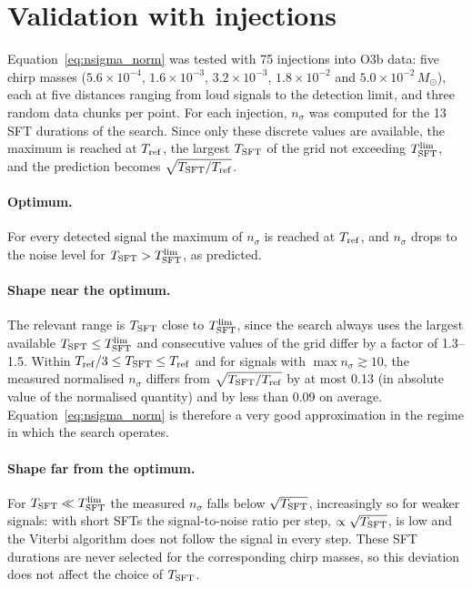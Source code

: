 \documentclass[11pt]{article}
\newcommand{\Tsft}{T_{\rm SFT}}
\newcommand{\Tlim}{T_{\rm SFT}^{\rm lim}}
\begin{document}
\section{Validation with injections}

Equation~\eqref{eq:nsigma_norm} was tested with 75 injections into O3b data:
five chirp masses ($5.6\times10^{-4}$, $1.6\times10^{-3}$, $3.2\times10^{-3}$,
$1.8\times10^{-2}$ and $5.0\times10^{-2}\,M_\odot$), each at five distances ranging
from loud signals to the detection limit, and three random data chunks per point.
For each injection, $n_\sigma$ was computed for the 13 SFT durations of the search.
Since only these discrete values are available, the maximum is reached at
$T_{\rm ref}$, the largest $\Tsft$ of the grid not exceeding $\Tlim$, and the
prediction becomes $\sqrt{\Tsft/T_{\rm ref}}$.

\paragraph{Optimum.} For every detected signal the maximum of $n_\sigma$ is
reached at $T_{\rm ref}$, and $n_\sigma$ drops to the noise level for
$\Tsft > \Tlim$, as predicted.

\paragraph{Shape near the optimum.} The relevant range is $\Tsft$ close to
$\Tlim$, since the search always uses the largest available $\Tsft \le \Tlim$ and
consecutive values of the grid differ by a factor of 1.3--1.5. Within
$T_{\rm ref}/3 \le \Tsft \le T_{\rm ref}$ and for signals with
$\max n_\sigma \gtrsim 10$, the measured normalised $n_\sigma$ differs from
$\sqrt{\Tsft/T_{\rm ref}}$ by at most 0.13 (in absolute value of the normalised
quantity) and by less than 0.09 on average. Equation~\eqref{eq:nsigma_norm} is
therefore a very good approximation in the regime in which the search operates.

\paragraph{Shape far from the optimum.} For $\Tsft \ll \Tlim$ the measured
$n_\sigma$ falls below $\sqrt{\Tsft}$, increasingly so for weaker signals: with
short SFTs the signal-to-noise ratio per step, $\propto\sqrt{\Tsft}$, is low and
the Viterbi algorithm does not follow the signal in every step. These SFT
durations are never selected for the corresponding chirp masses, so this
deviation does not affect the choice of $\Tsft$.
\end{document}
